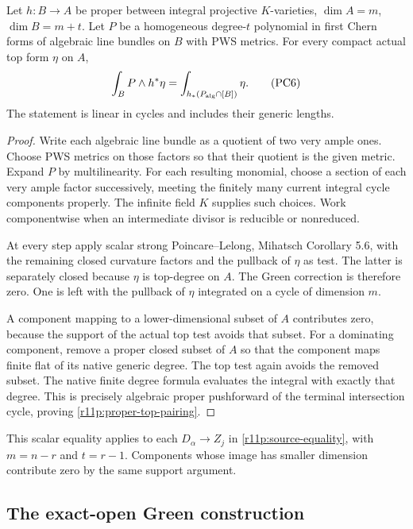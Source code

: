 \begin{lemma}
\label{r11p:proper-chern-degree}
Let $h:B\to A$ be proper between integral projective $K$-varieties,
$\dim A=m$, $\dim B=m+t$.  Let $P$ be a homogeneous degree-$t$
polynomial in first Chern forms of algebraic line bundles on $B$
with PWS metrics.  For every compact actual top form $\eta$ on $A$,
\[
              \int_BP\wedge h^*\eta
                =\int_{h_*(P_{\rm alg}\cap[B])}\eta.
\tag{PC6}\label{r11p:proper-top-pairing}
\]
The statement is linear in cycles and includes their generic lengths.
\end{lemma}

\begin{proof}
Write each algebraic line bundle as a quotient of two very ample ones.
Choose PWS metrics on those factors so that their quotient is the
given metric.  Expand $P$ by multilinearity.  For each resulting
monomial, choose a section of each very ample factor successively,
meeting the finitely many current integral cycle components properly.
The infinite field $K$ supplies such choices.  Work componentwise
when an intermediate divisor is reducible or nonreduced.

At every step apply scalar strong Poincare--Lelong, Mihatsch
Corollary 5.6, with the remaining closed curvature factors and the
pullback of $\eta$ as test.  The latter is separately closed because
$\eta$ is top-degree on $A$.  The Green correction is therefore zero.
One is left with the pullback of $\eta$ integrated on a cycle of
dimension $m$.

A component mapping to a lower-dimensional subset of $A$ contributes
zero, because the support of the actual top test avoids that subset.
For a dominating component, remove a proper closed subset of $A$
so that the component maps finite flat of its native generic degree.
The top test again avoids the removed subset.  The native finite
degree formula evaluates the integral with exactly that degree.
This is precisely algebraic proper pushforward of the terminal
intersection cycle, proving \eqref{r11p:proper-top-pairing}.
\end{proof}

This scalar equality applies to
each $D_\alpha\to Z_j$ in \eqref{r11p:source-equality}, with
$m=n-r$ and $t=r-1$.  Components whose image has smaller dimension
contribute zero by the same support argument.

\subsection{The exact-open Green construction}

